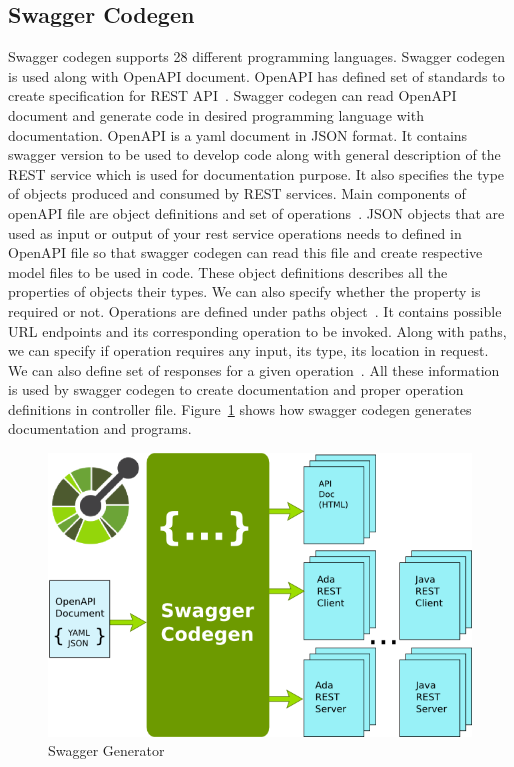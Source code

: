 \subsection{Swagger Codegen}
Swagger codegen supports 28 different programming languages. Swagger codegen is
used along with OpenAPI document. OpenAPI has defined set of standards to
create specification for REST API~\cite{hid-sp18-502-swagger}. Swagger codegen
can read OpenAPI document
and generate code in desired programming language with documentation. OpenAPI
is a yaml document in JSON format. It contains swagger version to be used to
develop code along with general description of the REST service which is used
for documentation purpose. It also specifies the type of objects produced and
consumed by REST services. Main components of openAPI file are object
definitions and set of operations~\cite{hid-sp18-502-swagger}. JSON objects
that are used as input or
output of your rest service operations needs to defined in OpenAPI file so that
swagger codegen can read this file and create respective model files to be
used in code.
These object definitions describes all the properties of objects their types.
We can also specify whether the property is required or not. Operations are
defined under paths object~\cite{hid-sp18-502-swagger}. It contains possible
URL endpoints and its
corresponding operation to be invoked. Along with paths, we can specify if
operation requires any input, its type, its location in request. We can also
define set of responses for a given operation~\cite{hid-sp18-502-swagger}.
All these information is used by
swagger codegen to create documentation and proper operation definitions in
controller file. Figure~\ref{fig:swagger-generator} shows how swagger codegen
generates documentation and programs.

\begin{figure}[!ht]
        \centering\includegraphics[width=\columnwidth]
        {image/swagger-generator.PNG}
        \caption{Swagger Generator}\label{fig:swagger-generator}
\end{figure}

